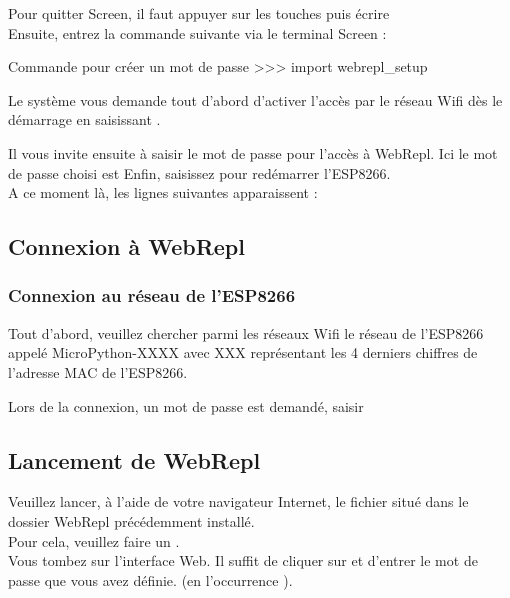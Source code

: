 

Pour quitter Screen, il faut appuyer sur les touches  puis écrire  \\

Ensuite, entrez la commande suivante via le terminal Screen :
\begin{Bash}{Commande pour créer un mot de passe}
>>> import webrepl_setup
\end{Bash}

Le système vous demande tout d'abord d’activer l’accès par le réseau Wifi dès le démarrage en saisissant .


Il vous invite ensuite à saisir le mot de passe pour l'accès à WebRepl. Ici le mot de passe choisi est 
Enfin, saisissez  pour redémarrer l'ESP8266.\\
A ce moment là, les lignes suivantes apparaissent : 



\subsection{Connexion à WebRepl}



\subsubsection{Connexion au réseau de l'ESP8266}

Tout d'abord, veuillez chercher parmi les réseaux Wifi le réseau de l'ESP8266 appelé MicroPython-XXXX avec XXX représentant les 4 derniers chiffres de l'adresse MAC de l'ESP8266.

Lors de la connexion, un mot de passe est demandé, saisir 

\subsection{Lancement de WebRepl}

 Veuillez lancer, à l'aide de votre navigateur Internet, le fichier   situé dans le dossier WebRepl précédemment installé. \\
 Pour cela, veuillez faire un . \\
Vous tombez sur l’interface Web. Il suffit de cliquer sur  et d’entrer le mot de passe que vous avez définie.
(en l'occurrence ).



